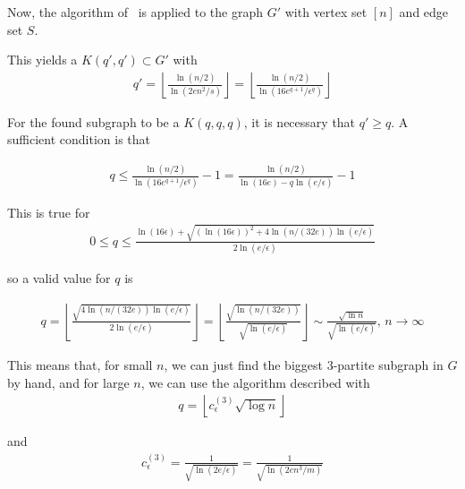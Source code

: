 \documentclass[12pt]{article}
\begin{document}
    Now, the algorithm of~\cite{MUBAYI2010174} is applied to the graph $G'$ with vertex set $[n]$
    and edge set $S$. %

    This yields a $K(q', q') \subset G'$ with
    \begin{align*}
        q' = \left \lfloor \frac{\ln(n/2)}{\ln(2en^2/s)} \right \rfloor =
        \left \lfloor \frac{\ln(n/2)}{\ln(16e^{q+1} / \epsilon^q)} \right \rfloor
    \end{align*}

    For the found subgraph to be a $K(q, q, q)$, it is necessary that $q' \geq q$.
    A sufficient condition is that

    \begin{align*}
        q \leq \frac{\ln(n/2)}{\ln(16e^{q+1} / \epsilon^q)} - 1 =
        \frac{\ln(n/2)}{\ln(16e) - q  \ln(e / \epsilon)} - 1
    \end{align*}

    This is true for
    \begin{align*}
        0 \leq q \leq
        \frac
        {\ln(16 \epsilon) + \sqrt {(\ln(16 \epsilon))^2 + 4\ln(n/(32e))\ln(e/ \epsilon)}}
        {2\ln(e / \epsilon)}
    \end{align*}

    so a valid value for $q$ is

    \begin{align*}
        q =
        \left \lfloor
        \frac{\sqrt {4 \ln(n/(32e))\ln(e/ \epsilon)}}
        {2\ln(e / \epsilon)}
        \right \rfloor =
        \left \lfloor
        \frac{\sqrt {\ln(n/(32e))}}
        {\sqrt {\ln(e / \epsilon)}}
        \right \rfloor \sim
        \frac{\sqrt {\ln n}}{\sqrt {\ln(e / \epsilon)}}, \,
        n \to \infty
    \end{align*}

    This means that, for small $n$, we can just find the biggest $3$-partite
    subgraph in $G$ by hand, and for large $n$, we can use the algorithm
    described with
    \begin{align*}
        q = \left \lfloor c^{(3)}_{\epsilon} \sqrt {\log n} \right \rfloor
    \end{align*}

    and
    \begin{align*}
        c^{(3)}_{\epsilon} = \frac{1}{\sqrt {\ln(2e / \epsilon)}} =
        \frac{1}{\sqrt {\ln(2en^3/m)}}
    \end{align*}
\end{document}
